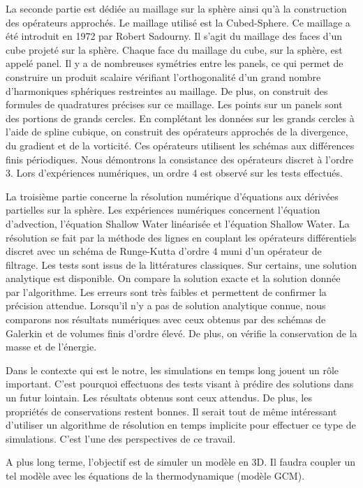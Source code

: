 \documentclass[10pt,a4paper]{article}
\begin{document}
La seconde partie est dédiée au maillage sur la sphère ainsi qu'à la construction des opérateurs approchés. Le maillage utilisé est la Cubed-Sphere. Ce maillage a été introduit en 1972 par Robert Sadourny. Il s'agit du maillage des faces d'un cube projeté sur la sphère. Chaque face du maillage du cube, sur la sphère, est appelé panel. Il y a de nombreuses symétries entre les panels, ce qui permet de construire un produit scalaire vérifiant l'orthogonalité d'un grand nombre d'harmoniques sphériques restreintes au maillage. De plus, on construit des formules de quadratures précises sur ce maillage. Les points sur un panels sont des portions de grands cercles. En complétant les données sur les grands cercles à l'aide de spline cubique, on construit des opérateurs approchés de la divergence, du gradient et de la vorticité. Ces opérateurs utilisent les schémas aux différences finis périodiques. Nous démontrons la consistance des opérateurs discret à l'ordre 3. Lors d'expériences numériques, un ordre 4 est observé sur les tests effectués.

La troisième partie concerne la résolution numérique d'équations aux dérivées partielles sur la sphère. Les expériences numériques concernent l'équation d'advection, l'équation Shallow Water linéarisée et l'équation Shallow Water. La résolution se fait par la méthode des lignes en couplant les opérateurs différentiels discret avec un schéma de Runge-Kutta d'ordre 4 muni d'un opérateur de filtrage. Les tests sont issus de la littératures classiques. Sur certains, une solution analytique est disponible. On compare la solution exacte et la solution donnée par l'algorithme. Les erreurs sont très faibles et permettent de confirmer la précision attendue. Lorsqu'il n'y a pas de solution analytique connue, nous comparons nos résultats numériques avec ceux obtenus par des schémas de Galerkin et de volumes finis d'ordre élevé. De plus, on vérifie la conservation de la masse et de l'énergie. 

Dans le contexte qui est le notre, les simulations en temps long jouent un rôle important. C'est pourquoi effectuons des tests visant à prédire des solutions dans un futur lointain. Les résultats obtenus sont ceux attendus. De plus, les propriétés de conservations restent bonnes. Il serait tout de même intéressant d'utiliser un algorithme de résolution en temps implicite pour effectuer ce type de simulations. C'est l'une des perspectives de ce travail.

A plus long terme, l'objectif est de simuler un modèle en 3D. Il faudra coupler un tel modèle avec les équations de la thermodynamique (modèle GCM).
\end{document}
